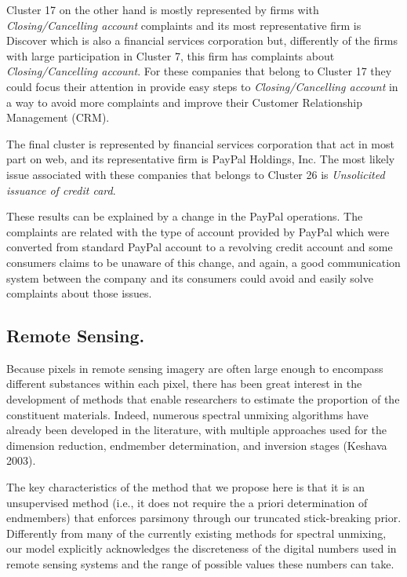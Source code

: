 \documentclass[article]{jss}
\begin{document}
Cluster 17 on the other hand is mostly represented by firms with
\emph{Closing/Cancelling account} complaints and its most representative
firm is Discover which is also a financial services corporation but,
differently of the firms with large participation in Cluster 7, this
firm has complaints about \emph{Closing/Cancelling account}. For these
companies that belong to Cluster 17 they could focus their attention in
provide easy steps to \emph{Closing/Cancelling account} in a way to
avoid more complaints and improve their Customer Relationship Management
(CRM).

The final cluster is represented by financial services corporation that
act in most part on web, and its representative firm is PayPal Holdings,
Inc. The most likely issue associated with these companies that belongs
to Cluster 26 is \emph{Unsolicited issuance of credit card}.

These results can be explained by a change in the PayPal operations. The
complaints are related with the type of account provided by PayPal which
were converted from standard PayPal account to a revolving credit
account and some consumers claims to be unaware of this change, and
again, a good communication system between the company and its consumers
could avoid and easily solve complaints about those issues.

\subsection{Remote Sensing.}\label{remote-sensing.}

Because pixels in remote sensing imagery are often large enough to
encompass different substances within each pixel, there has been great
interest in the development of methods that enable researchers to
estimate the proportion of the constituent materials. Indeed, numerous
spectral unmixing algorithms have already been developed in the
literature, with multiple approaches used for the dimension reduction,
endmember determination, and inversion stages (Keshava 2003).

The key characteristics of the method that we propose here is that it is
an unsupervised method (i.e., it does not require the a priori
determination of endmembers) that enforces parsimony through our
truncated stick-breaking prior. Differently from many of the currently
existing methods for spectral unmixing, our model explicitly
acknowledges the discreteness of the digital numbers used in remote
sensing systems and the range of possible values these numbers can take.
\end{document}
